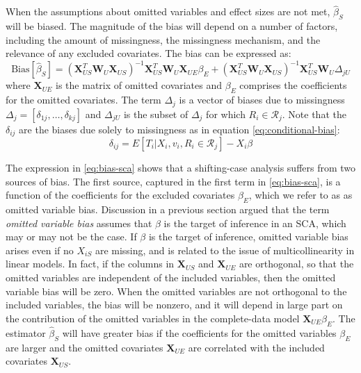 \documentclass[
]{article}
\begin{document}
When the assumptions about omitted variables and effect sizes are not met, \(\hat{\beta}_S\) will be biased.
The magnitude of the bias will depend on a number of factors, including the amount of missingness, the missingness mechanism, and the relevance of any excluded covariates.
The bias can be expressed as:
\begin{equation}
\text{Bias}[\hat{\beta}_S] = (\mathbf{X}_{US}^T \mathbf{W}_U \mathbf{X}_{US})^{-1}\mathbf{X}_{US}^T \mathbf{W}_U \mathbf{X}_{UE} \beta_E + (\mathbf{X}_{US}^T \mathbf{W}_U \mathbf{X}_{US})^{-1}\mathbf{X}_{US}^T \mathbf{W}_U \Delta_{jU}
\label{eq:bias-sca}
\end{equation}
where \(\mathbf{X}_{UE}\) is the matrix of omitted covariates and \(\beta_E\) comprises the coefficients for the omitted covariates. The term \(\Delta_j\) is a vector of biases due to missingness \(\Delta_j = [\delta_{1j}, \ldots, \delta_{kj}]\) and \(\Delta_{jU}\) is the subset of \(\Delta_j\) for which \(R_i \in \mathcal{R}_j\).
Note that the \(\delta_{ij}\) are the biases due solely to missingness as in equation \eqref{eq:conditional-bias}:
\[
\delta_{ij} = E[T_i | X_i, v_i, R_i \in \mathcal{R}_j] - X_i \beta
\]

The expression in \eqref{eq:bias-sca} shows that a shifting-case analysis suffers from two sources of bias.
The first source, captured in the first term in \eqref{eq:bias-sca}, is a function of the coefficients for the excluded covariates \(\beta_E\), which we refer to as as omitted variable bias.
Discussion in a previous section argued that the term \emph{omitted variable bias} assumes that \(\beta\) is the target of inference in an SCA, which may or may not be the case.
If \(\beta\) is the target of inference, omitted variable bias arises even if no \(X_{iS}\) are missing, and is related to the issue of multicollinearity in linear models.
In fact, if the columns in \(\mathbf{X}_{US}\) and \(\mathbf{X}_{UE}\) are orthogonal, so that the omitted variables are independent of the included variables, then the omitted variable bias will be zero.
When the omitted variables are not orthogonal to the included variables, the bias will be nonzero, and it will depend in large part on the contribution of the omitted variables in the complete-data model \(\mathbf{X}_{UE} \beta_E\).
The estimator \(\hat{\beta}_S\) will have greater bias if the coefficients for the omitted variables \(\beta_E\) are larger and the omitted covariates \(\mathbf{X}_{UE}\) are correlated with the included covariates \(\mathbf{X}_{US}\).
\end{document}
